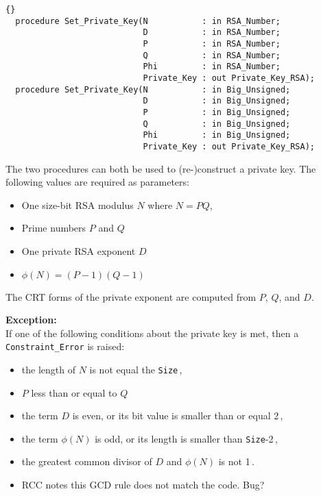 \hhline
\begin{lstlisting}{}
  procedure Set_Private_Key(N           : in RSA_Number;
                            D           : in RSA_Number;
                            P           : in RSA_Number;
                            Q           : in RSA_Number;
                            Phi         : in RSA_Number;
                            Private_Key : out Private_Key_RSA);
  procedure Set_Private_Key(N           : in Big_Unsigned;
                            D           : in Big_Unsigned;
                            P           : in Big_Unsigned;
                            Q           : in Big_Unsigned;
                            Phi         : in Big_Unsigned;
                            Private_Key : out Private_Key_RSA);
\end{lstlisting}
The two procedures can both be used to (re-)construct a private
key. The following values are required as parameters:
\begin{itemize}
\item One size-bit RSA modulus $N$ where $N=PQ$,
\item Prime numbers $P$ and $Q$
\item One private RSA exponent $D$
\item $\phi(N)=(P-1)(Q-1)$
\end{itemize}
The CRT forms of the private exponent are computed from $P$, $Q$, and $D$.

\noindent\textbf{Exception:}\\ If one of the following conditions about the
private key is met, then a \texttt{Constraint\_Error} is raised:
\begin{itemize}
\item the length of $N$ is not equal the \texttt{Size}\,,
\item $P$ less than or equal to $Q$
\item the term $D$ is even, or its bit value is smaller than or equal 2\,,
\item the term $\phi(N)$ is odd, or its length is smaller than
  \texttt{Size}-2\,,
\item the greatest common divisor of $D$ and $\phi(N)$ is not 1\,.
\item RCC notes this GCD rule does not match the code.  Bug?
\end{itemize}


